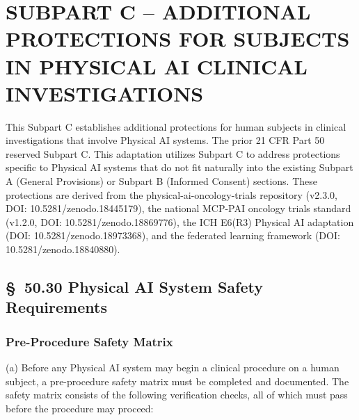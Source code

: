 
\section{SUBPART C -- ADDITIONAL PROTECTIONS FOR SUBJECTS IN PHYSICAL AI CLINICAL INVESTIGATIONS}

This Subpart C establishes additional protections for human subjects in clinical investigations that involve Physical AI systems. The prior 21 CFR Part 50 reserved Subpart C. This adaptation utilizes Subpart C to address protections specific to Physical AI systems that do not fit naturally into the existing Subpart A (General Provisions) or Subpart B (Informed Consent) sections. These protections are derived from the physical-ai-oncology-trials repository (v2.3.0, DOI: 10.5281/zenodo.18445179), the national MCP-PAI oncology trials standard (v1.2.0, DOI: 10.5281/zenodo.18869776), the ICH E6(R3) Physical AI adaptation (DOI: 10.5281/zenodo.18973368), and the federated learning framework (DOI: 10.5281/zenodo.18840880).

\subsection{\S~50.30 Physical AI System Safety Requirements}

\subsubsection{Pre-Procedure Safety Matrix}

(a) Before any Physical AI system may begin a clinical procedure on a human subject, a pre-procedure safety matrix must be completed and documented. The safety matrix consists of the following verification checks, all of which must pass before the procedure may proceed:

